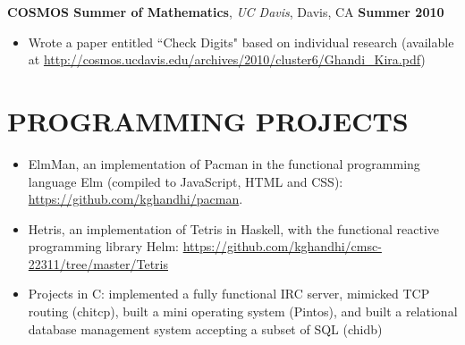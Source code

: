\documentclass[9pt]{res} %
\begin{document}
\begin{resume}
\textbf{COSMOS Summer of Mathematics}, \textit{UC Davis}, Davis, CA \hspace{\fill} \textbf{Summer 2010}
\begin{itemize}
\item Wrote a paper entitled ``Check Digits" based on individual research (available at \url{http://cosmos.ucdavis.edu/archives/2010/cluster6/Ghandi\_Kira.pdf}) 
\end{itemize}
\vspace{-5pt}

\section{PROGRAMMING PROJECTS}
\begin{itemize} 
\item ElmMan, an implementation of Pacman in the functional programming language Elm (compiled to JavaScript, HTML and CSS): \url{https://github.com/kghandhi/pacman}.
\item Hetris, an implementation of Tetris in Haskell, with the functional reactive programming library Helm: \url{https://github.com/kghandhi/cmsc-22311/tree/master/Tetris}
\item Projects in C: implemented a fully functional IRC server, mimicked TCP routing (chitcp), built a mini operating system (Pintos), and built a relational database management system accepting a subset of SQL (chidb)
\end{itemize}

\vspace{-5pt}


\end{resume}
\end{document}
